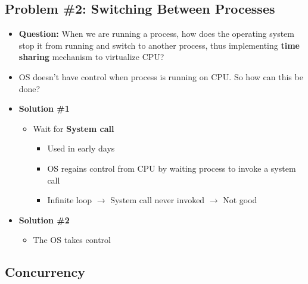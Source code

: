 \documentclass[12pt]{article}
\begin{document}
\subsection{Problem \#2: Switching Between Processes}
\begin{itemize}
    \item \textbf{Question:} When we are running a process, how does the operating system stop it
    from running and switch to another process, thus implementing \textbf{time sharing} mechanism
    to virtualize CPU?
    \item OS doesn't have control when process is running on CPU. So how can this be done?
    \item \textbf{Solution \#1}
    \begin{itemize}
        \item Wait for \textbf{System call}
        \begin{itemize}
            \item Used in early days
            \item OS regains control from CPU by waiting process to invoke a system call
            \item Infinite loop $\to$ System call never invoked $\to$ Not good
        \end{itemize}
    \end{itemize}
    \item \textbf{Solution \#2}
    \begin{itemize}
        \item The OS takes control
    \end{itemize}
\end{itemize}

\subsection{Concurrency}
\end{document}
